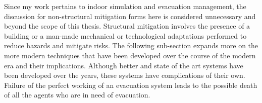 Since my work pertains to indoor simulation and evacuation management, the discussion for non-structural mitigation forms here is considered unnecessary and beyond the scope of this thesis. Structural mitigation involves the presence of a building or a man-made mechanical or technological adaptations performed to reduce hazards and mitigate risks. The following sub-section expands more on the more modern techniques that have been developed over the course of the modern era and their implications. Although better and state of the art systems have been developed over the years, these systems have complications of their own. Failure of the perfect working of an evacuation system leads to the possible death of all the agents who are in need of evacuation. 







